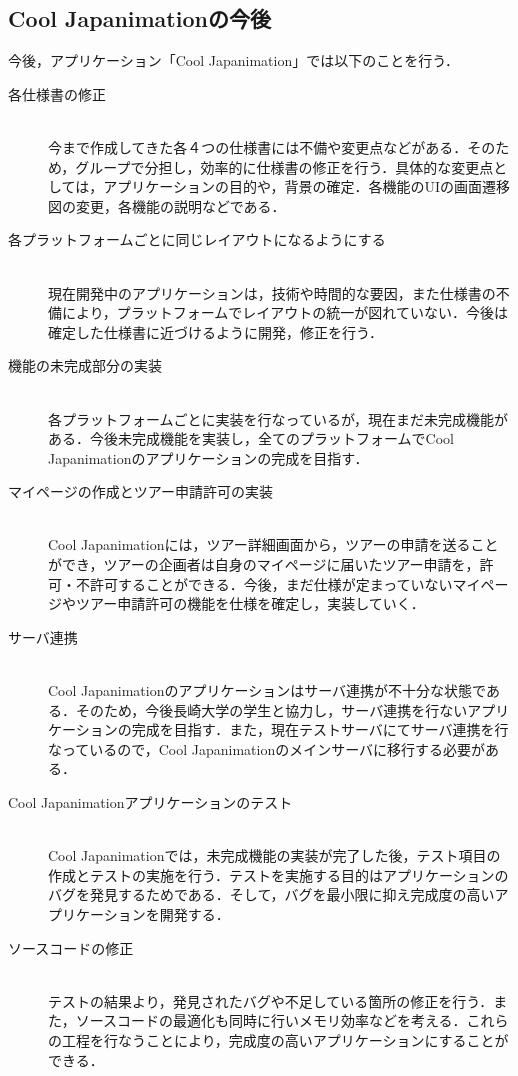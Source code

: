 \subsection{Cool Japanimationの今後}
\par
今後，アプリケーション「Cool Japanimation」では以下のことを行う．
\begin{description}
\item[各仕様書の修正]\mbox{}\\
今まで作成してきた各４つの仕様書には不備や変更点などがある．そのため，グループで分担し，効率的に仕様書の修正を行う．具体的な変更点としては，アプリケーションの目的や，背景の確定．各機能のUIの画面遷移図の変更，各機能の説明などである．
\item[各プラットフォームごとに同じレイアウトになるようにする]\mbox{}\\
現在開発中のアプリケーションは，技術や時間的な要因，また仕様書の不備により，プラットフォームでレイアウトの統一が図れていない．今後は確定した仕様書に近づけるように開発，修正を行う．
\item[機能の未完成部分の実装]\mbox{}\\
各プラットフォームごとに実装を行なっているが，現在まだ未完成機能がある．今後未完成機能を実装し，全てのプラットフォームでCool Japanimationのアプリケーションの完成を目指す．
\item[マイページの作成とツアー申請許可の実装]\mbox{}\\
Cool Japanimationには，ツアー詳細画面から，ツアーの申請を送ることができ，ツアーの企画者は自身のマイページに届いたツアー申請を，許可・不許可することができる．今後，まだ仕様が定まっていないマイページやツアー申請許可の機能を仕様を確定し，実装していく．
\item[サーバ連携]\mbox{}\\
Cool Japanimationのアプリケーションはサーバ連携が不十分な状態である．そのため，今後長崎大学の学生と協力し，サーバ連携を行ないアプリケーションの完成を目指す．また，現在テストサーバにてサーバ連携を行なっているので，Cool Japanimationのメインサーバに移行する必要がある．
\item[Cool Japanimationアプリケーションのテスト]\mbox{}\\
Cool Japanimationでは，未完成機能の実装が完了した後，テスト項目の作成とテストの実施を行う．テストを実施する目的はアプリケーションのバグを発見するためである．そして，バグを最小限に抑え完成度の高いアプリケーションを開発する．
\item[ソースコードの修正]\mbox{}\\
テストの結果より，発見されたバグや不足している箇所の修正を行う．また，ソースコードの最適化も同時に行いメモリ効率などを考える．これらの工程を行なうことにより，完成度の高いアプリケーションにすることができる．

\end{description}
